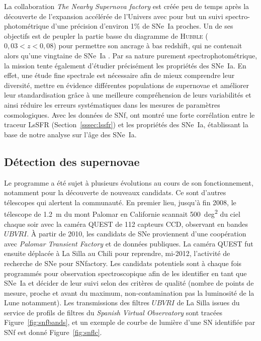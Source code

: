 \documentclass[../main/main.tex]{subfiles}
\begin{document}
La collaboration \textit{The Nearby Supernova factory}
\citep[SNfactory,][]{aldering2002} est créée peu de temps après la découverte de
l'expansion accélérée de l'Univers \citep{riess1998, perlmutter1999} avec pour
but un suivi spectro-photométrique d'une précision d'environ 1\% de SNe~Ia
proches. Un de ses objectifs est de peupler la partie basse du diagramme de
\textsc{Hubble} ($0,03 < z < 0,08$) pour permettre son ancrage à bas redshift,
qui ne contenait alors qu'une vingtaine de SNe~Ia \citep{hamuy1996}. Par sa
nature purement spectrophotométrique, la mission tente également d'étudier
précisément les propriétés des SNe~Ia. En effet, une étude fine spectrale est
nécessaire afin de mieux comprendre leur diversité, mettre en évidence
différentes populations de supernovae et améliorer leur standardisation grâce à
une meilleure compréhension de leurs variabilités et ainsi réduire les erreurs
systématiques dans les mesures de paramètres cosmologiques. Avec les données de
SNf, \cite{rigault2020} ont montré une forte corrélation entre le traceur LsSFR
(Section~\ref{sssec:lssfr}) et les propriétés des SNe~Ia, établissant la base de
notre analyse sur l'âge des SNe~Ia.

\subsection{Détection des supernovae}\label{ssec:snfdetec}

Le programme a été sujet à plusieurs évolutions au cours de son fonctionnement,
notamment pour la découverte de nouveaux candidats. Ce sont d'autres télescopes
qui alertent la communauté. En premier lieu, jusqu'à fin 2008, le télescope de
\SI{1,2}{m} du mont Palomar en Californie \citep{rabinowitz2003} scannait
\SI{500}{deg^2} du ciel chaque soir avec la caméra QUEST de 112 capteurs CCD,
observant en bandes $UBVRI$. À partir de 2010, les candidats de SNe proviennent
d'une coopération avec \textit{Palomar Transient Factory}
\citep[PTF,][]{law2009} et de données publiques. La caméra QUEST fut ensuite
déplacée à La Silla au Chili \citep[LSQ,][]{hadjiyska2012} pour reprendre,
mi-2012, l'activité de recherche de SNe pour SNfactory. Les candidats potentiels
sont à chaque fois programmés pour observation spectroscopique afin de les
identifier en tant que SNe~Ia et décider de leur suivi selon des critères de
qualité (nombre de points de mesure, proche et avant du maximum,
non-contamination pas la luminosité de la Lune notamment). Les transmissions des
filtres $UBVRI$ de La Silla issues du service de profils de filtres du
\textit{Spanish Virtual Observatory} \citep[SVO\footnote{
    \href{http://svo2.cab.inta-csic.es/theory/fps/index.php?asttype=astro}
{http://svo2.cab.inta-csic.es/theory/fps/index.php?asttype=astro}},][]
{rodrigo2020} sont tracées Figure~\ref{fig:snfbands}, et un exemple de courbe de
lumière d'une SN identifiée par SNf est donné Figure~\ref{fig:snflc}.
\end{document}
